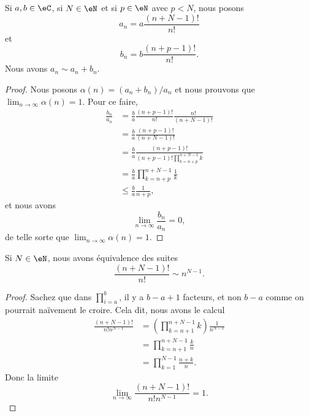 \begin{lemma}       \label{LEMooVMLEooCzPuKy}
	Si \( a,b\in \eC\), si \( N\in \eN\) et si \( p\in \eN\) avec \( p<N\), nous posons
	\begin{equation}
		a_n=a\frac{ (n+N-1)! }{ n! }
	\end{equation}
	et
	\begin{equation}
		b_n=b\frac{ (n+p-1)! }{ n! }.
	\end{equation}
	Nous avons \( a_n\sim a_n+b_n\).
\end{lemma}

\begin{proof}
	Nous posons \( \alpha(n)=(a_n+b_n)/a_n\) et nous prouvons que \( \lim_{n\to \infty} \alpha(n)=1\). Pour ce faire,
	\begin{subequations}
		\begin{align}
			\frac{ b_n }{ a_n } & =\frac{ b }{ a }\frac{ (n+p-1)! }{ n! }\frac{ n! }{ (n+N-1)! }      \\
			                    & =\frac{ b }{ a }\frac{ (n+p-1)! }{ (n+N-1)! }                       \\
			                    & =\frac{ b }{ a }\frac{ (n+p-1)! }{ (n+p-1)!\prod_{k=n+p}^{n+N-1}k } \\
			                    & =\frac{ b }{ a }\prod_{k=n+p}^{n+N-1}\frac{1}{ k }                  \\
			                    & \leq \frac{ b }{ a }\frac{1}{ n+p },
		\end{align}
	\end{subequations}
	et nous avons
	\begin{equation}
		\lim_{n\to \infty} \frac{ b_n }{ a_n }=0,
	\end{equation}
	de telle sorte que \( \lim_{n\to \infty} \alpha(n)=1\).
\end{proof}

\begin{lemma}       \label{LEMooTGHHooZHZsgE}
	Si \( N\in \eN\), nous avons équivalence des suites
	\begin{equation}
		\frac{ (n+N-1)! }{ n! }\sim n^{N-1}.
	\end{equation}
\end{lemma}

\begin{proof}
	Sachez que dans \( \prod_{i=a}^b\), il y a \( b-a+1\) facteurs, et non \( b-a\) comme on pourrait naïvement le croire. Cela dit, nous avons le calcul
	\begin{subequations}
		\begin{align}
			\frac{ (n+N-1)! }{ n!n^{N-1} } & =\left( \prod_{k=n+1}^{n+N-1}k \right)\frac{1}{ n^{N-1} } \\
			                               & =\prod_{k=n+1}^{n+N-1}\frac{ k }{ n }                     \\
			                               & =\prod_{k=1}^{N-1}\frac{ n+k }{ n }.
		\end{align}
	\end{subequations}
	Donc la limite
	\begin{equation}
		\lim_{n\to \infty} \frac{ (n+N-1)! }{ n!n^{N-1} }=1.
	\end{equation}
\end{proof}

